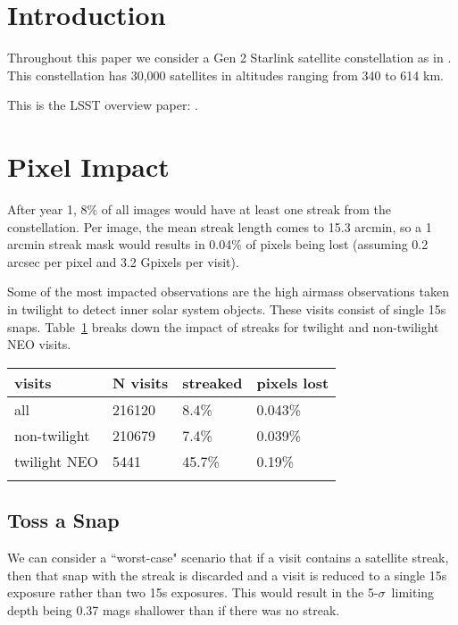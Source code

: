 \section{Introduction}

Throughout this paper we consider a Gen 2 Starlink satellite constellation as in \citet{Hu2022}. This constellation has 30,000 satellites in altitudes ranging from 340 to 614 km. 

This is the LSST overview paper: \cite{2008arXiv0805.2366I}.



\section{Pixel Impact}

After year 1, 8\% of all images would have at least one streak from the constellation. Per image, the mean streak length comes to 15.3 arcmin, so a 1 arcmin streak mask would results in 0.04\% of pixels being lost (assuming 0.2 arcsec per pixel and 3.2 Gpixels per visit).

Some of the most impacted observations are the high airmass observations taken in twilight to detect inner solar system objects. These visits consist of single 15s snaps. Table~\ref{table:pixel} breaks down the impact of streaks for twilight and non-twilight NEO visits. 

\begin{table}
\begin{tabular}{ l  l  l l}
  visits & N visits & streaked & pixels lost \\
  \hline			
  all & 216120 & 8.4\%  & 0.043\% \\
  non-twilight & 210679 & 7.4\% &  0.039\% \\
  twilight NEO & 5441 & 45.7\% & 0.19\% \\
  \hline  
  \label{table:pixel}
\end{tabular}
\end{table}


\subsection{Toss a Snap}

We can consider a ``worst-case" scenario that if a visit contains a satellite streak, then that snap with the streak is discarded and a visit is reduced to a single 15s exposure rather than two 15s exposures. This would result in the 5-$\sigma$\ limiting depth being 0.37 mags shallower than if there was no streak.

